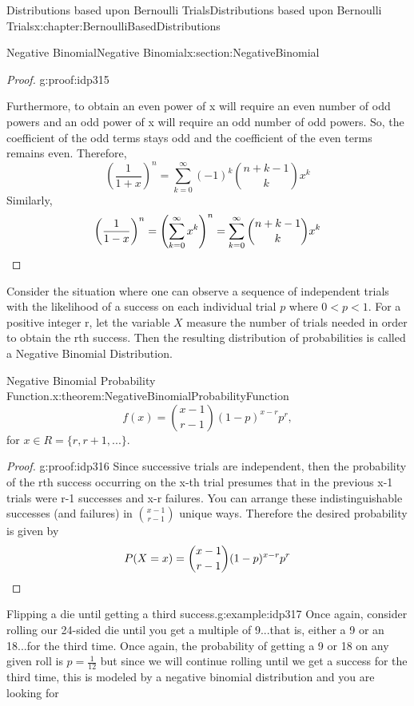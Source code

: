 \documentclass[oneside,10pt,]{book}
\newcommand{\qedhere}{\relax}
\numberwithin{equation}{section}
\newcommand{\lt}{<}
\begin{document}
\begin{chapterptx}{Distributions based upon Bernoulli Trials}{}{Distributions based upon Bernoulli Trials}{}{}{x:chapter:BernoulliBasedDistributions}
\begin{sectionptx}{Negative Binomial}{}{Negative Binomial}{}{}{x:section:NegativeBinomial}
\begin{proof}{}{g:proof:idp315}
\par
Furthermore, to obtain an even power of x will require an even number of odd powers and an odd power of x will require an odd number of odd powers. So, the coefficient of the odd terms stays odd and the coefficient of the even terms remains even. Therefore,%
\begin{equation*}
\left ( \frac{1}{1+x} \right )^n = \sum_{k=0}^{\infty} {(-1)^k \binom{n + k - 1}{k} x^k}
\end{equation*}
Similarly,%
\begin{equation*}
\left ( \frac{1}{1-x} \right )^n = \left ( \sum_{k=0}^{\infty} {x^k} \right )^n = \sum_{k=0}^{\infty} {\binom{n + k - 1}{k} x^k}\qedhere
\end{equation*}
%
\end{proof}
%
\par
Consider the situation where one can observe a sequence of independent trials with the likelihood of a success on each individual trial \(p\) where \(0 \lt p \lt 1 \). For a positive integer r, let the variable \(X\) measure the number of trials needed in order to obtain the rth success. Then the resulting distribution of probabilities is called a Negative Binomial Distribution.%
\par
\begin{theorem}{Negative Binomial Probability Function.}{}{x:theorem:NegativeBinomialProbabilityFunction}%
%
\begin{equation*}
f(x) = \binom{x - 1}{r-1}(1-p)^{x-r}p^r,
\end{equation*}
for \(x \in R = \{r, r+1, ... \}\).%
\end{theorem}
\begin{proof}{}{g:proof:idp316}
Since successive trials are independent, then the probability of the rth success occurring on the x-th trial presumes that in the previous x-1 trials were r-1 successes and x-r failures. You can arrange these indistinguishable successes (and failures) in \(\binom{x-1}{r-1}\) unique ways. Therefore the desired probability is given by%
\begin{equation*}
P(X=x) = \binom{x - 1}{r-1}(1-p)^{x-r}p^r\qedhere
\end{equation*}
%
\end{proof}
%
\begin{example}{Flipping a die until getting a third success.}{g:example:idp317}%
Once again, consider rolling our 24-sided die until you get a multiple of 9...that is, either a 9 or an 18...for the third time. Once again, the probability of getting a 9 or 18 on any given roll is \(p = \frac{1}{12}\) but since we will continue rolling until we get a success for the third time, this is modeled by a negative binomial distribution and you are looking for%

\end{example}
\end{sectionptx}
\end{chapterptx}
\end{document}
